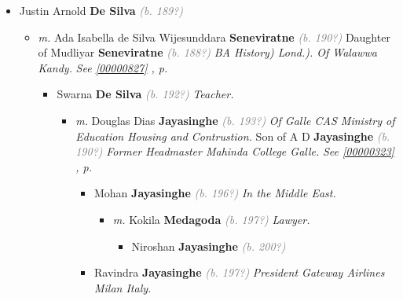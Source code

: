 \documentclass[10pt, openany]{book}
\begin{document}
\begin{itemize}
{\begin{itemize}
{\begin{itemize}
{\begin{itemize}
{\begin{itemize}
\end{itemize}
  }
\end{itemize}}
\end{itemize}
  }
\item{Justin Arnold \textbf{De Silva} \textcolor{gray}{\textit{(b. 189?)}}
\begin{itemize}
\item{\textit{m.} Ada Isabella de Silva Wijesunddara \textbf{Seneviratne} \textcolor{gray}{\textit{(b. 190?)}} Daughter of  Mudliyar \textbf{Seneviratne} \textcolor{gray}{\textit{(b. 188?)}} \textcolor{slmaroon}{\textit{BA History) Lond.).
Of Walawwa Kandy.}} \textcolor{slteal}{\textit{See  \autoref{00000827} \textit{, p. \pageref{00000827} }}}   \label{couple:00000150:00000818} \begin{itemize}
\item{Swarna \textbf{De Silva} \textcolor{gray}{\textit{(b. 192?)}} \textcolor{slmaroon}{\textit{Teacher.}}
\begin{itemize}
\item{\textit{m.} Douglas Dias \textbf{Jayasinghe} \textcolor{gray}{\textit{(b. 193?)}} \textcolor{slmaroon}{\textit{Of Galle CAS Ministry of Education Housing and Contrustion.}} Son of  A D \textbf{Jayasinghe} \textcolor{gray}{\textit{(b. 190?)}} \textcolor{slmaroon}{\textit{Former Headmaster Mahinda College Galle.}} \textcolor{slteal}{\textit{See  \autoref{00000323} \textit{, p. \pageref{00000323} }}}   \label{couple:00000165:00000326} \begin{itemize}
\item{Mohan \textbf{Jayasinghe} \textcolor{gray}{\textit{(b. 196?)}} \textcolor{slmaroon}{\textit{In the Middle East.}}
\begin{itemize}
\item{\textit{m.} Kokila \textbf{Medagoda} \textcolor{gray}{\textit{(b. 197?)}} \textcolor{slmaroon}{\textit{Lawyer.}}   \label{couple:00000333:00000534} \begin{itemize}
\item{Niroshan \textbf{Jayasinghe} \textcolor{gray}{\textit{(b. 200?)}}
 }
\end{itemize}}
\end{itemize}
 }
\item{Ravindra \textbf{Jayasinghe} \textcolor{gray}{\textit{(b. 197?)}} \textcolor{slmaroon}{\textit{President Gateway Airlines Milan Italy.}}
\begin{itemize}

\end{itemize}}
\end{itemize}}
\end{itemize}}
\end{itemize}}
\end{itemize}}
\end{itemize}}
\end{itemize}
\end{document}
